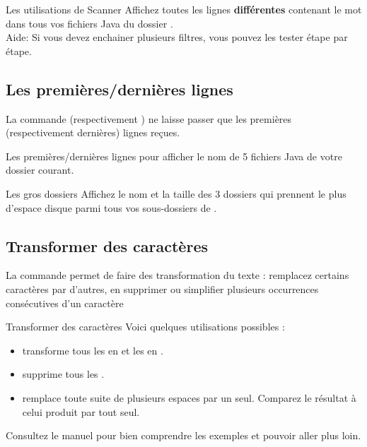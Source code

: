 \documentclass[a4paper,11pt]{style-esi/td}
\begin{document}
		\begin{Exercice}{Les utilisations de Scanner}
			Affichez toutes les lignes \textbf{différentes}
			contenant le mot  dans tous vos fichiers Java
			du dossier .
			\\Aide: 
			Si vous devez enchainer plusieurs filtres,
			vous pouvez les tester étape par étape.
		\end{Exercice}

	\subsection{Les premières/dernières lignes}
	
		La commande  (respectivement )
		ne laisse passer que les premières (respectivement dernières)
		lignes reçues.

		\begin{Experience}{Les premières/dernières lignes}
			pour afficher le nom de 5 fichiers Java de votre dossier courant.
		\end{Experience}

		\begin{Exercice}{Les gros dossiers}
			Affichez le nom et la taille des 3 dossiers 
			qui prennent le plus d'espace disque 
			parmi tous vos sous-dossiers de . 
		\end{Exercice}

	\subsection{Transformer des caractères}
	
		La commande  permet de faire des transformation du texte :
		remplacez certains caractères par d'autres, en supprimer ou simplifier 
		plusieurs occurrences consécutives d'un caractère 

		\begin{Exemple}{Transformer des caractères}
			Voici quelques utilisations possibles :
			\begin{itemize}
			\item 
				transforme tous les  en 
				et les  en .
			\item
				supprime tous les .
			\item 
				remplace toute suite de plusieurs espaces par un seul.
				Comparez le résultat à celui produit par  tout seul.
			\end{itemize}
			Consultez le manuel pour bien comprendre les exemples
			et pouvoir aller plus loin.
		\end{Exemple}
\end{document}
